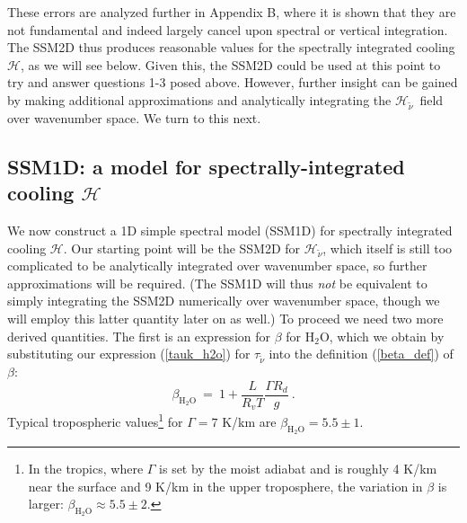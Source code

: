 \documentclass{ametsoc}
\newcommand{\beqn}{\begin{equation}}
\newcommand{\eeqn}{\end{equation}}
\newcommand{\eqnref}[1]{(\ref{#1})}
\newcommand{\Rd}{\ensuremath{R_d}}
\newcommand{\Rv}{\ensuremath{R_v}}
\newcommand{\htwo}{\ensuremath{\mathrm{H_2O}}}
\newcommand{\wv}{\ensuremath{\widetilde{\nu}}}
\newcommand{\ch}{\ensuremath{\mathcal{H}}}
\newcommand{\chk}{\ensuremath{\ch_{\wv}}}
\newcommand{\tauk}{\ensuremath{\tau_{\wv}}}
\begin{document}
These errors are analyzed further in Appendix B, where it is shown that they are not fundamental and indeed largely cancel upon spectral or vertical integration. The SSM2D thus produces reasonable values for the spectrally integrated cooling \ch, as we will see below. Given this, the SSM2D could be used at this point to try and answer questions 1-3 posed above. However, further insight can be gained by making additional approximations and analytically integrating the \chk\ field over wavenumber space. We turn to this next.
 
 
\subsection{SSM1D: a model for spectrally-integrated cooling \ch} \label{sec_h2o_integrated}
 We now construct a 1D simple spectral model (SSM1D) for spectrally integrated cooling \ch. Our starting point will be the SSM2D for \chk, which itself is still  too complicated to be analytically integrated over wavenumber space, so further approximations will be required. (The SSM1D will thus  \emph{not} be equivalent to simply integrating the SSM2D numerically over wavenumber space, though we will employ this latter quantity later on as well.)  To proceed we need two more derived quantities. The first is an expression for $\beta$ for \htwo, which we obtain by substituting our expression \eqnref{tauk_h2o} for $\tauk$  into the definition \eqnref{beta_def} of $\beta$:
\beqn
	\beta_{\htwo} \ = \ 1+ \frac{L}{\Rv T}\frac{\Gamma \Rd}{g} \ .
	\label{beta_h2o}
\eeqn
Typical tropospheric values\footnote{In the tropics, where $\Gamma$ is set by the moist adiabat and is roughly  4 K/km near the surface and 9 K/km in the upper troposphere, the variation in $\beta$ is larger: $\beta_{\htwo}\approx5.5 \pm 2$.} for $\Gamma=7$ K/km are $\beta_{\htwo}=5.5 \pm 1$.
\end{document}
